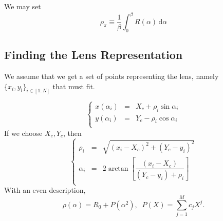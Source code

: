 \documentclass[aps,onecolumn]{revtex4}
\begin{document}
We may set 
\begin{equation}
	\rho_\pi \equiv \dfrac{1}{\beta}\int_0^\beta R(\alpha)\,\mathrm{d}\alpha
\end{equation}

\subsection{Finding the Lens Representation}
We assume that we get a set of points representing the lens, namely $\lbrace x_i,y_i \rbrace_{i\in[1:N]}$ that must
fit.

\begin{equation}
	\left\lbrace
		\begin{array}{rcl}
	x(\alpha_i) & = & X_c + \rho_i\sin\alpha_i\\
	y(\alpha_i) & = & Y_c - \rho_i\cos\alpha_i\\
		\end{array}
	\right.
\end{equation}
If we choose $X_c,Y_c$, then
\begin{equation}
	\left\lbrace
	\begin{array}{rcl}	
	\rho_i   &=&\sqrt{\left(x_i-X_c\right)^2+\left(Y_c-y_i\right)^2}\\
	\alpha_i &=& 2 \arctan\left[ \dfrac{\left(x_i-X_c\right)}{\left(Y_c-y_i\right)+\rho_i}\right]\\
	\end{array}
	\right.
\end{equation}
With an even description,
\begin{equation}
	\rho(\alpha) = R_0 + P(\alpha^2),\;\; P(X) = \sum_{j=1}^{M} c_j X^j.
\end{equation}
\end{document}
